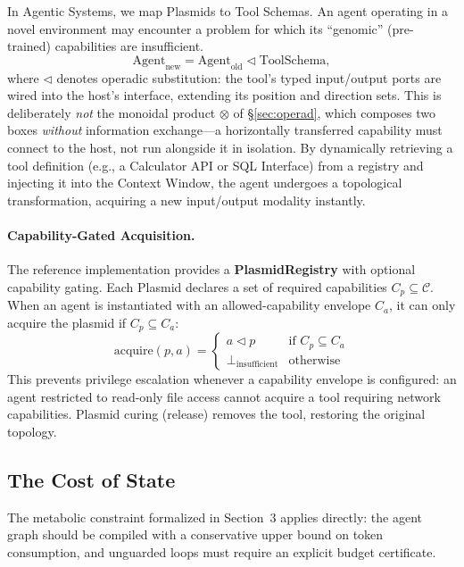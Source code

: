In Agentic Systems, we map Plasmids to Tool Schemas. An agent operating in a novel environment may encounter a
problem for which its ``genomic'' (pre-trained) capabilities are insufficient.
\begin{equation}
\mathrm{Agent}_{\text{new}} = \mathrm{Agent}_{\text{old}} \triangleleft \mathrm{ToolSchema},
\label{eq:horizontal-gene-transfer}
\end{equation}
where $\triangleleft$ denotes operadic substitution: the tool's typed input/output ports are wired into the
host's interface, extending its position and direction sets. This is deliberately \emph{not} the monoidal
product $\otimes$ of \S\ref{sec:operad}, which composes two boxes \emph{without} information exchange---a
horizontally transferred capability must connect to the host, not run alongside it in isolation.
By dynamically retrieving a tool definition (e.g., a Calculator API or SQL Interface) from a registry and
injecting it into the Context Window, the agent undergoes a topological transformation, acquiring a new
input/output modality instantly.

\paragraph{Capability-Gated Acquisition.}
The reference implementation provides a \textbf{PlasmidRegistry} with optional capability gating. Each Plasmid declares a set of required capabilities $C_p \subseteq \mathcal{C}$. When an agent is instantiated with an allowed-capability envelope $C_a$, it can only acquire the plasmid if $C_p \subseteq C_a$:
\begin{equation}
\mathrm{acquire}(p, a) =
\begin{cases}
a \triangleleft p & \text{if } C_p \subseteq C_a \\
\bot_{\text{insufficient}} & \text{otherwise}
\end{cases}
\label{eq:capability-gated-acquisition}
\end{equation}
This prevents privilege escalation whenever a capability envelope is configured: an agent restricted to read-only file access cannot acquire a tool requiring network capabilities. Plasmid curing (release) removes the tool, restoring the original topology.

\subsection{The Cost of State}
The metabolic constraint formalized in Section~3 applies directly: the agent graph should be compiled with a conservative upper bound on token consumption, and unguarded loops must require an explicit budget certificate.

